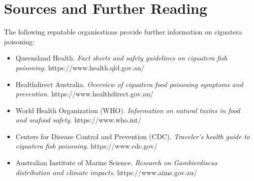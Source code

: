 \section*{Sources and Further Reading}
The following reputable organisations provide further information on ciguatera poisoning:
\begin{itemize}
    \item Queensland Health. \textit{Fact sheets and safety guidelines on ciguatera fish poisoning.} https://www.health.qld.gov.au/
    \item Healthdirect Australia. \textit{Overview of ciguatera food poisoning symptoms and prevention.} https://www.healthdirect.gov.au/
    \item World Health Organization (WHO). \textit{Information on natural toxins in food and seafood safety.} https://www.who.int/
    \item Centers for Disease Control and Prevention (CDC). \textit{Traveler's health guide to ciguatera fish poisoning.} https://www.cdc.gov/
    \item Australian Institute of Marine Science. \textit{Research on Gambierdiscus distribution and climate impacts.} https://www.aims.gov.au/
\end{itemize}

